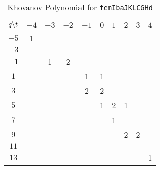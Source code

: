 \documentclass{article}
\theoremstyle{plain}
\begin{document}
        \begin{table}[H]
            \centering
            \begin{tabular}{| c | c | c | c | c | c | c | c | c | c |}
                \hline
                $q\symbol{92}t$&$-4$&$-3$&$-2$&$-1$&$0$&$1$&$2$&$3$&$4$\\
                \hline
                $-5$&1&&&&&&&&\\
                \hline
                $-3$&&&&&&&&&\\
                \hline
                $-1$&&1&2&&&&&&\\
                \hline
                $1$&&&&1&1&&&&\\
                \hline
                $3$&&&&2&2&&&&\\
                \hline
                $5$&&&&&1&2&1&&\\
                \hline
                $7$&&&&&&1&&&\\
                \hline
                $9$&&&&&&&2&2&\\
                \hline
                $11$&&&&&&&&&\\
                \hline
                $13$&&&&&&&&&1\\
                \hline
            \end{tabular}
            \caption{Khovanov Polynomial for \texttt{femIbaJKLCGHd}}
            \label{table:femIbaJKLCGHd_kho}
        \end{table}
\end{document}
